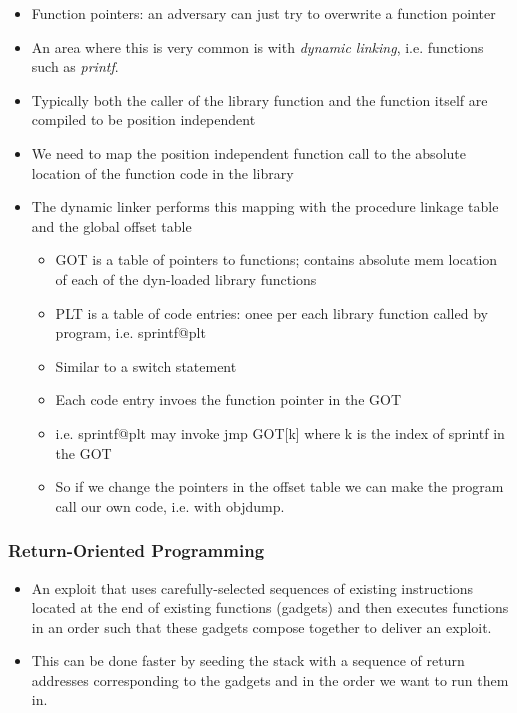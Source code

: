\documentclass[../notes.tex]{subfiles}
\begin{document}
\begin{itemize}
    \item Function pointers: an adversary can just try to overwrite a function pointer
    \item An area where this is very common is with \textit{dynamic linking}, i.e. functions such as \textit{printf}. 
    \item Typically both the caller of the library function and the function itself are compiled to be position independent
    \item We need to map the position independent function call to the absolute location of the function code in the library
    \item The dynamic linker performs this mapping with the procedure linkage table and the global offset table
        \begin{itemize}
            \item GOT is a table of pointers to functions; contains absolute mem location of each of the dyn-loaded library functions
            \item PLT is a table of code entries: onee per each library function called by program, i.e. sprintf@plt
            \item Similar to a switch statement
            \item Each code entry invoes the function pointer in the GOT
            \item i.e. sprintf@plt may invoke jmp GOT[k] where k is the index of sprintf in the GOT
            \item So if we change the pointers in the offset table we can make the program call our own code, i.e. with objdump.

        \end{itemize}
\end{itemize}




\subsubsection{Return-Oriented Programming}
\begin{itemize}
    \item An exploit that uses carefully-selected sequences of existing instructions located at the end of existing functions (gadgets) and then executes functions in an order such that these gadgets compose together to deliver an exploit. 
    \item This can be done faster by seeding the stack with a sequence of return addresses corresponding to the gadgets and in the order we want to run them in.
\end{itemize}
\end{document}
